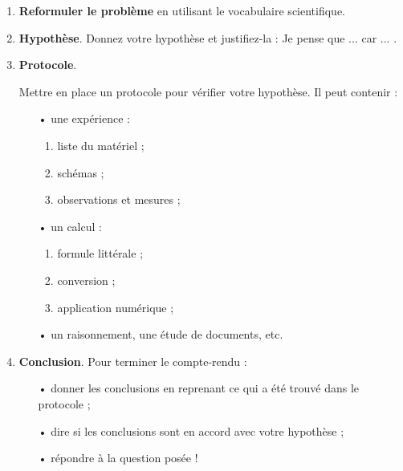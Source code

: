 \documentclass[12pt,a4paper]{article}
\begin{document}
\begin{enumerate}
\item \textbf{Reformuler le problème} en utilisant le vocabulaire scientifique. \hfill \app{}

\item \textbf{Hypothèse}. Donnez votre hypothèse et justifiez-la : \og Je pense que ... car ... \fg{}. \hfill \anarai{}

\item \textbf{Protocole}. \hfill \app{} \anarai{} \rea{}

Mettre en place un protocole pour vérifier votre hypothèse. Il peut contenir :
\vspace{-0.5\baselineskip}
\begin{multicols}{2}
\begin{itemize}
\item[•] une expérience :
\begin{enumerate}
\item liste du matériel ;
\item schémas ;
\item observations et mesures ;
\end{enumerate}
\item[•] un calcul :
\begin{enumerate}
\item formule littérale ;
\item conversion ;
\item application numérique ;
\end{enumerate}
\end{itemize}
\end{multicols}
\vspace{-1.\baselineskip}
\begin{itemize}
\item[•] un raisonnement, une étude de documents, etc.
\end{itemize}
\item \textbf{Conclusion}. Pour terminer le compte-rendu : \hfill \val{}
\begin{itemize}
\item[•] donner les conclusions en reprenant ce qui a été trouvé dans le protocole ;
\item[•] dire si les conclusions sont en accord avec votre hypothèse ;
\item[•] répondre à la question posée !
\end{itemize}
\end{enumerate}

\newpage
\end{document}
